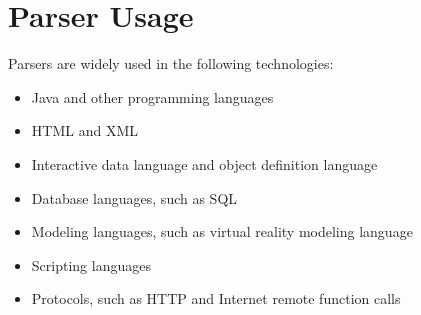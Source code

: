 \documentclass[12pt]{article}
\begin{document}
\section{Parser Usage}

Parsers are widely used in the following technologies:

\begin{itemize}
	\item Java and other programming languages
	\item HTML and XML
	\item Interactive data language and object definition language
	\item Database languages, such as SQL
	\item Modeling languages, such as virtual reality modeling language
	\item Scripting languages
	\item Protocols, such as HTTP and Internet remote function calls
\end{itemize}
\end{document}
